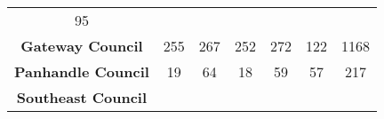 \documentclass[]{article}
\begin{document}
\begin{longtable}[]{@{}ccccccc@{}}
\begin{minipage}[t]{0.05\columnwidth}
95\strut
\end{minipage}\tabularnewline
\begin{minipage}[t]{0.26\columnwidth}\centering\strut
\textbf{Gateway Council}\strut
\end{minipage} & \begin{minipage}[t]{0.13\columnwidth}\centering\strut
255\strut
\end{minipage} & \begin{minipage}[t]{0.14\columnwidth}\centering\strut
267\strut
\end{minipage} & \begin{minipage}[t]{0.14\columnwidth}\centering\strut
252\strut
\end{minipage} & \begin{minipage}[t]{0.05\columnwidth}\centering\strut
272\strut
\end{minipage} & \begin{minipage}[t]{0.05\columnwidth}\centering\strut
122\strut
\end{minipage} & \begin{minipage}[t]{0.05\columnwidth}\centering\strut
1168\strut
\end{minipage}\tabularnewline
\begin{minipage}[t]{0.26\columnwidth}\centering\strut
\textbf{Panhandle Council}\strut
\end{minipage} & \begin{minipage}[t]{0.13\columnwidth}\centering\strut
19\strut
\end{minipage} & \begin{minipage}[t]{0.14\columnwidth}\centering\strut
64\strut
\end{minipage} & \begin{minipage}[t]{0.14\columnwidth}\centering\strut
18\strut
\end{minipage} & \begin{minipage}[t]{0.05\columnwidth}\centering\strut
59\strut
\end{minipage} & \begin{minipage}[t]{0.05\columnwidth}\centering\strut
57\strut
\end{minipage} & \begin{minipage}[t]{0.05\columnwidth}\centering\strut
217\strut
\end{minipage}\tabularnewline
\begin{minipage}[t]{0.26\columnwidth}\centering\strut
\textbf{Southeast Council}\strut
\end{minipage} & \begin{minipage}[t]{0.13\columnwidth}\centering\strut

\end{minipage}
\end{longtable}
\end{document}
